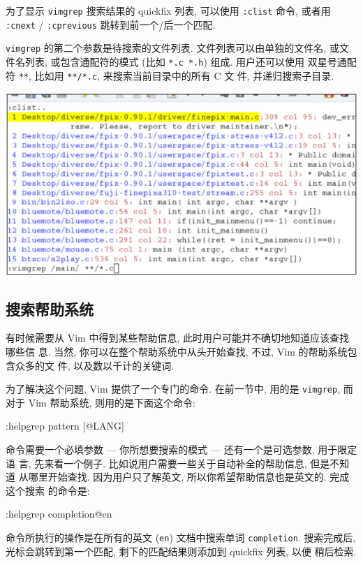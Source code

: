 \begin{warning}
    为了显示 \texttt{vimgrep} 搜索结果的 quickfix 列表, 可以使用 \texttt{:clist}
    命令, 或者用 \texttt{:cnext} / \texttt{:cprevious} 跳转到前一个/后一个匹配.
\end{warning}

\texttt{vimgrep} 的第二个参数是待搜索的文件列表. 文件列表可以由单独的文件名,
或文件名列表, 或包含通配符的模式 (比如 \texttt{*.c *.h}) 组成. 用户还可以使用
双星号通配符 \texttt{**}, 比如用 \texttt{**/*.c}, 来搜索当前目录中的所有 C 文
件, 并递归搜索子目录.
\begin{center}
    \includegraphics[scale=0.7]{./images/page66.png}
\end{center}
\subsection{搜索帮助系统}
\label{subsec:search_the_help_system}

有时候需要从 Vim 中得到某些帮助信息, 此时用户可能并不确切地知道应该查找哪些信
息. 当然, 你可以在整个帮助系统中从头开始查找, 不过, Vim 的帮助系统包含众多的文
件, 以及数以千计的关键词.

为了解决这个问题, Vim 提供了一个专门的命令. 在前一节中, 用的是
\texttt{vimgrep}, 而对于 Vim 帮助系统, 则用的是下面这个命令:
\begin{vimcode}
:helpgrep pattern [@LANG]
\end{vimcode}
命令需要一个必填参数 --- 你所想要搜索的模式 --- 还有一个是可选参数, 用于限定语
言, 先来看一个例子. 比如说用户需要一些关于自动补全的帮助信息, 但是不知道
从哪里开始查找. 因为用户只了解英文, 所以你希望帮助信息也是英文的. 完成这个搜索
的命令是:
\begin{vimcode}
:helpgrep completion@en
\end{vimcode}
命令所执行的操作是在所有的英文 (\texttt{en}) 文档中搜索单词 \texttt{completion}.
搜索完成后, 光标会跳转到第一个匹配, 剩下的匹配结果则添加到 quickfix 列表, 以便
稍后检索.

